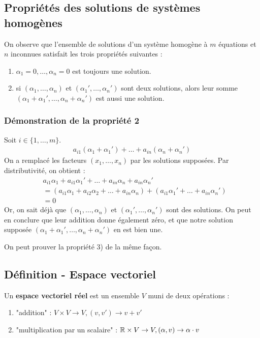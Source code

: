 \documentclass[12pt]{article}
\begin{document}
\pagebreak
\subsection{Propriétés des solutions de systèmes homogènes}
On observe que l'ensemble de solutions d'un système homogène à $m$ équations et $n$ inconnues satisfait les trois propriétés suivantes :
\begin{enumerate}
    \item $\alpha_1 = 0, \dots, \alpha_n = 0$ est toujours une solution.
    \item si $(\alpha_1, \dots, \alpha_n)$ et $(\alpha_1', \dots, \alpha_n')$ 
    sont deux solutions, alors leur somme $(\alpha_1+\alpha_1', \dots, \alpha_n+\alpha_n')$ est aussi une solution.
\end{enumerate}
\subsubsection{Démonstration de la propriété 2}
Soit $i \in \{1, \dots, m\}$.
$$\begin{aligned}
a_{i1}(\alpha_1+\alpha_1') + \dots + a_{in}(\alpha_n+\alpha_n')
\end{aligned}
$$
On a remplacé les facteurs $(x_1, \dots, x_n)$ par les solutions supposées.
Par distributivité, on obtient :
$$\begin{aligned}
    &a_{i1}\alpha_1 + a_{i1}\alpha_1' + \dots + a_{in}\alpha_n + a_{in}\alpha_n' \\
    &= (a_{i1}\alpha_{1}+a_{i2}\alpha_2+\dots+a_{in}\alpha_n) + (a_{i1}\alpha_{1}'+\dots+a_{in}\alpha_n') \\
    &= 0 
\end{aligned}
$$
Or, on sait déjà que $(\alpha_1, \dots, \alpha_n)$ et $(\alpha_1', \dots, \alpha_n')$ sont des solutions. On peut en conclure que leur addition donne également zéro, et que notre solution supposée $(\alpha_1 + \alpha_1', \dots, \alpha_n + \alpha_n')$ en est bien une.

On peut prouver la propriété 3) de la même façon.

\pagebreak
\subsection{Définition - Espace vectoriel}
Un \textbf{espace vectoriel réel} est un ensemble $V$ muni de deux opérations :
\begin{enumerate}
    \item "addition" : $V \times V \rightarrow V, (v, v') \rightarrow v + v'$
    \item "multiplication par un scalaire" : $\mathbb{R} \times V \rightarrow V, (\alpha, v) \rightarrow \alpha \cdot v$ 
\end{enumerate}
\end{document}
